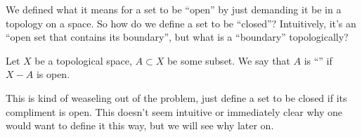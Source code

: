 
\begin{prob}
We defined what it means for a set to be ``open'' by just demanding it
be in a topology on a space. So how do we define a set to be
``closed''? Intuitively, it's an ``open set that contains its
boundary'', but what is a ``boundary'' topologically?
\end{prob}

\begin{defn}
Let $X$ be a topological space, $A\subset X$ be some subset. We say
that $A$ is ``'' if $X-A$ is open.
\end{defn}
\begin{rmk}
This is kind of weaseling out of the problem, just define a set to be
closed if its compliment is open. This doesn't seem intuitive or
immediately clear why one would want to define it this way, but we
will see why later on.
\end{rmk}

